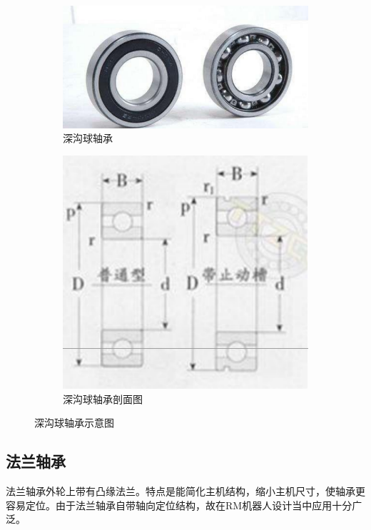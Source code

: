 \documentclass[UTF8]{article} %
\begin{document}
\begin{figure}[H]
  \centering
  \begin{subfigure}[b]{0.4\textwidth}
         \centering
         \includegraphics[width=\textwidth]{zhou1.png}
          \caption{深沟球轴承}
  \end{subfigure}
  \quad
  \begin{subfigure}[b]{0.2\textwidth}
          \centering
          \includegraphics[width=\textwidth]{zhou2.png}
          \caption{深沟球轴承剖面图}
  \end{subfigure}
  \caption{深沟球轴承示意图}
\end{figure}

\subsection{法兰轴承}
法兰轴承外轮上带有凸缘法兰。特点是能简化主机结构，缩小主机尺寸，使轴承更容易定位。由于法兰轴承自带轴向定位结构，故在RM机器人设计当中应用十分广泛。
\end{document}
